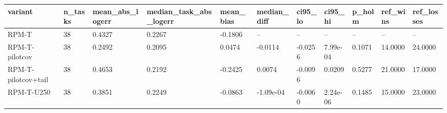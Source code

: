 \begin{tabular}{lllllllllll}
\hline
variant & n\_tasks & mean\_abs\_logerr & median\_task\_abs\_logerr & mean\_bias & median\_diff & ci95\_lo & ci95\_hi & p\_holm & ref\_wins & ref\_losses \\
\hline
RPM-T & 38 & 0.4327 & 0.2267 & -0.1806 & – & – & – & – & – & – \\
RPM-T-pilotcov & 38 & 0.2492 & 0.2095 & 0.0474 & -0.0114 & -0.0256 & 7.99e-04 & 0.1071 & 14.0000 & 24.0000 \\
RPM-T-pilotcov+tail & 38 & 0.4653 & 0.2192 & -0.2425 & 0.0074 & -0.0096 & 0.0209 & 0.5277 & 21.0000 & 17.0000 \\
RPM-T-U250 & 38 & 0.3851 & 0.2249 & -0.0863 & -1.09e-04 & -0.0060 & 2.24e-06 & 0.1485 & 15.0000 & 23.0000 \\
\hline
\end{tabular}
